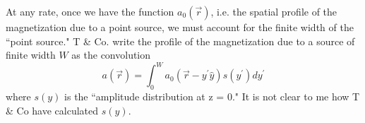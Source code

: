 \documentclass{article}
\begin{document}
At any rate, once we have the function $a_{0} (\vec{r})$, i.e. the spatial profile of the magnetization due to a point source, we must account for the finite width of the ``point source." T \& Co. write the profile of the magnetization due to a source of finite width $W$ as the convolution
\begin{equation}
a ( \vec{r} ) = \int_{0}^{W} a_{0}(\vec{r} - y^{\prime} \hat{y})s(y^{\prime})d y^{\prime}
\end{equation}  
where $s(y)$ is the ``amplitude distribution at z = 0." It is not clear to me how T \& Co have calculated $s(y)$.
\end{document}
